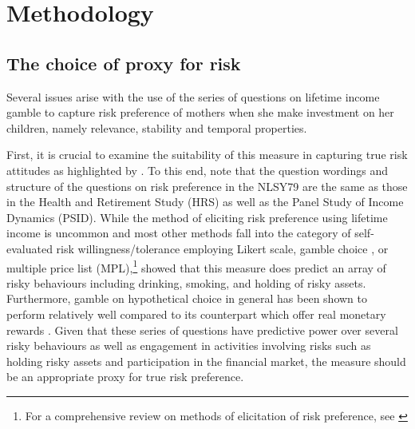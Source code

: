 \documentclass[emulatestandardclasses, 10pt, abstract = true]{scrartcl}
\begin{document}


\section{Methodology}
\subsection{The choice of proxy for risk}
Several issues arise with the use of the series of questions on lifetime income gamble to capture risk preference of mothers when she make investment on her children, namely relevance, stability and temporal properties. 

First, it is crucial to examine the suitability of this measure in capturing true risk attitudes as highlighted by \citet{yilmazer2015portfolio}. To this end, note that the question wordings and structure of the questions on risk preference in the NLSY79 are the same as those in the Health and Retirement Study (HRS) as well as the Panel Study of Income Dynamics (PSID). While the method of eliciting risk preference using lifetime income is uncommon and most other methods fall into the category of self-evaluated risk willingness/tolerance employing Likert scale, gamble choice \citep{eckel2002sex}, or multiple price list (MPL),\footnote{For a comprehensive review on methods of elicitation of risk preference, see \citet{charness2013experimental}} \citet{barsky1997preference} showed that this measure does predict an array of risky behaviours including drinking, smoking, and holding of risky assets. Furthermore, gamble on hypothetical choice in general has been shown to perform relatively well compared to its counterpart which offer real monetary rewards \citep{binswanger1981attitudes, camerer1999effects, dohmen2005individual}. Given that these series of questions have predictive power over several risky behaviours as well as engagement in activities involving risks such as holding risky assets and participation in the financial market, the measure should be an appropriate proxy for true risk preference. 
\end{document}
